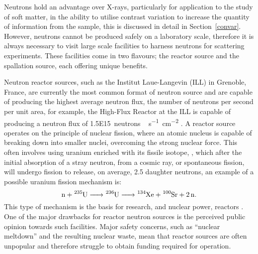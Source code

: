 Neutrons hold an advantage over X-rays, particularly for application to the study of soft matter, in the ability to utilise contrast variation to increase the quantity of information from the sample, this is discussed in detail in Section~\ref{convar}.
However, neutrons cannot be produced safely on a laboratory scale, therefore it is always necessary to visit large scale facilities to harness neutrons for scattering experiments.
These facilities come in two flavours; the reactor source and the spallation source, each offering unique benefits.

Neutron reactor sources, such as the Institut Laue-Langevin (ILL) in Grenoble, France, are currently the most common format of neutron source and are capable of producing the highest average neutron flux, the number of neutrons per second per unit area, for example, the High-Flux Reactor at the ILL is capable of producing a neutron flux of \SI{1.5E15}{neutrons\,\second^{-1}\centi\meter^{-2}} \cite{noauthor_ill_nodate}.
A reactor source operates on the principle of nuclear fission, where an atomic nucleus is capable of breaking down into smaller nuclei, overcoming the strong nuclear force. This often involves using uranium enriched with its fissile isotope, , which after the initial absorption of a stray neutron, from a cosmic ray, or spontaneous fission, will undergo fission to release, on average, 2.5 daughter neutrons, an example of a possible uranium fission mechanism is:
%
\begin{equation*}
    \ce{n + ^{235}U -> ^{236}U -> ^{134}Xe + ^{100}Sr + 2n}.
\end{equation*}
%
This type of mechanism is the basis for research, and nuclear power, reactors \cite{sivia_elementary_2011}.
One of the major drawbacks for reactor neutron sources is the perceived public opinion towards such facilities.
Major safety concerns, such as ``nuclear meltdown'' and the resulting nuclear waste, mean that reactor sources are often unpopular and therefore struggle to obtain funding required for operation.

